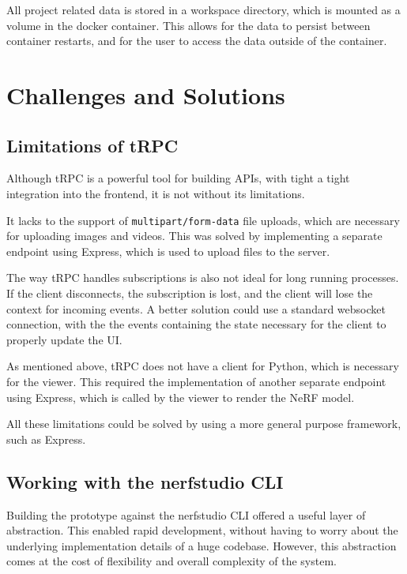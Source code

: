 All project related data is stored in a workspace directory, which is mounted as a volume in the docker container. 
This allows for the data to persist between container restarts, and for the user to access the data outside of the container.

\section{Challenges and Solutions}
\label{sec:system:challenges}

\subsection{Limitations of tRPC}

Although tRPC is a powerful tool for building APIs, with tight a tight integration into the frontend, it is not without its limitations.

It lacks to the support of \texttt{multipart/form-data} file uploads, which are necessary for uploading images and videos.
This was solved by implementing a separate endpoint using Express, which is used to upload files to the server.

The way tRPC handles subscriptions is also not ideal for long running processes.
If the client disconnects, the subscription is lost, and the client will lose the context for incoming events.
A better solution could use a standard websocket connection, with the the events containing the state necessary for the client to properly update the UI.

As mentioned above, tRPC does not have a client for Python, which is necessary for the viewer. 
This required the implementation of another separate endpoint using Express, which is called by the viewer to render the NeRF model.

All these limitations could be solved by using a more general purpose framework, such as Express.

\subsection{Working with the nerfstudio CLI}

Building the prototype against the nerfstudio CLI offered a useful layer of abstraction.
This enabled rapid development, without having to worry about the underlying implementation details of a huge codebase.
However, this abstraction comes at the cost of flexibility and overall complexity of the system.

